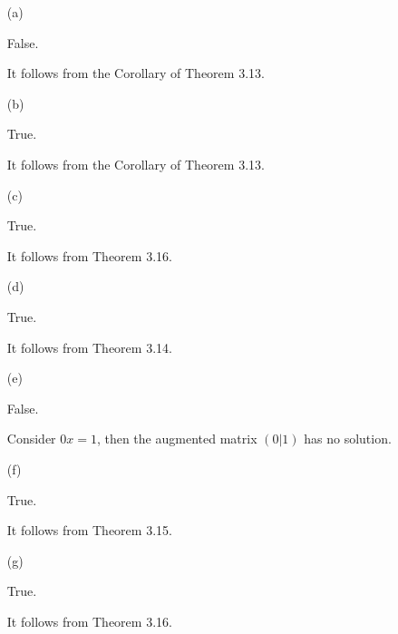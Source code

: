 \begin{Exercise}
\begin{enumerate}[(a)]
\item[(a)]
\begin{answer}
False.
\end{answer}
\begin{solution}
It follows from the Corollary of Theorem 3.13.
\end{solution}

\item[(b)]
\begin{answer}
True.
\end{answer}
\begin{solution}
It follows from the Corollary of Theorem 3.13.
\end{solution}

\item[(c)]
\begin{answer}
True.
\end{answer}
\begin{solution}
It follows from Theorem 3.16.
\end{solution}

\item[(d)]
\begin{answer}
True.
\end{answer}
\begin{solution}
It follows from Theorem 3.14.
\end{solution}

\item[(e)]
\begin{answer}
False.
\end{answer}
\begin{solution}
Consider $0x = 1$, then the augmented matrix $(0|1)$ has no solution.
\end{solution}

\item[(f)]
\begin{answer}
True.
\end{answer}
\begin{solution}
It follows from Theorem 3.15.
\end{solution}

\item[(g)]
\begin{answer}
True.
\end{answer}
\begin{solution}
It follows from Theorem 3.16.
\end{solution}

\end{enumerate}
\end{Exercise}